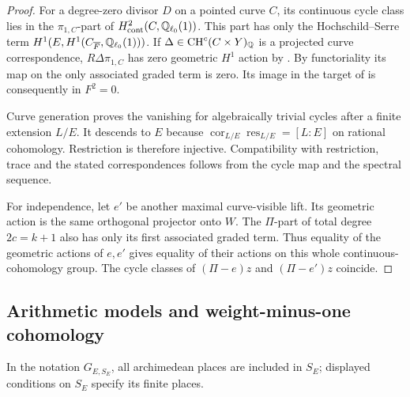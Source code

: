 \begin{proof}
For a degree-zero divisor \(D\) on a pointed curve \(C\), its
continuous cycle class lies in the \(\pi_{1,C}\)-part of
\(H^2_{\mathrm{cont}}(C,\mathbb Q_{\ell_0}(1))\). This part has only the
Hochschild--Serre term
\(H^1(E,H^1(C_{\overline F},\mathbb Q_{\ell_0}(1)))\).
If \(\Delta\in\operatorname{CH}^c(C\times Y)_\mathbb Q\) is a projected curve
correspondence, \(R\Delta\pi_{1,C}\) has zero geometric
\(H^1\) action by . By functoriality
its map on the only associated graded term is zero. Its image in
the target of  is consequently in
\(F^2=0\).

Curve generation proves the vanishing for algebraically trivial
cycles after a finite extension \(L/E\). It descends to \(E\)
because
\(\operatorname{cor}_{L/E}\operatorname{res}_{L/E}=[L:E]\)
on rational cohomology. Restriction is therefore injective.
Compatibility with restriction, trace and the stated
correspondences follows from the cycle map and the spectral
sequence.

For independence, let \(e'\) be another maximal curve-visible
lift. Its geometric action is the same orthogonal projector onto
\(W\). The \(\Pi\)-part of total degree \(2c=k+1\) also has
only its first associated graded term. Thus equality of the
geometric actions of \(e,e'\) gives equality of their actions on
this whole continuous-cohomology group. The cycle classes of
\((\Pi-e)z\) and \((\Pi-e')z\) coincide.
\end{proof}

\subsection{Arithmetic models and weight-minus-one cohomology}
\label{sec:fixed-model}

In the notation \(G_{E,S_E}\), all archimedean places are included
in \(S_E\); displayed conditions on \(S_E\) specify its finite
places.


